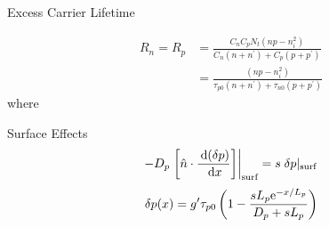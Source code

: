 \documentclass[a4paper, twocolumn]{article}
\begin{document}
    \par Excess Carrier Lifetime
            
    \begin{equation*}
            \begin{aligned}
                R_n = R_p &= \frac{C_n C_p N_t (np - n_i^2)}{C_n (n + n^\prime) + C_p(p + p^\prime)} \\
                &= \frac{(np - n_i^2)}{\tau_{p0}(n + n^\prime) + \tau_{n0} (p + p^\prime) } 
            \end{aligned}
    \end{equation*}
    where \\
    
    \par Surface Effects
    \begin{equation*}
        \begin{aligned}
            - D_p \left. \left[ \hat{n} \cdot \frac{\: \mathrm{d} (\delta p)}{\: \mathrm{d} x}  \right] \right|_{\text{surf}} = s \; \delta p |_{\text{surf}}
        \end{aligned}
    \end{equation*}
    \begin{equation*}
        \begin{aligned}
            \delta p(x) = g^\prime \tau_{p0} \left( 1 - \frac{sL_p\mathrm{e}^{-x/L_p} }{D_p + sL_p}  \right)
        \end{aligned}
    \end{equation*}
    
\end{document}
